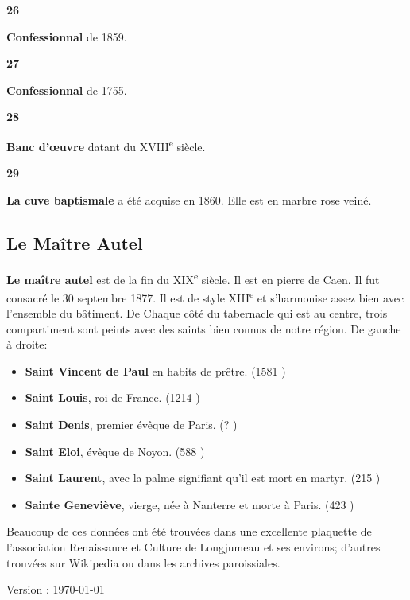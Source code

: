 \documentclass[a5paper, 9pt]{extarticle}
\newcommand{\linednote}[2]{
  \noindent
  \parbox[t]{0.9cm}{\small \textbf{#1}}%
  \parbox[t]{\dimexpr\linewidth-0.9cm}{\normalsize #2 \vspace{0.4em}}
  \newline
}
\begin{document}
\linednote{26}{\textbf{Confessionnal} de 1859.}
\linednote{27}{\textbf{Confessionnal} de 1755.}
\linednote{28}{\textbf{Banc d'œuvre} datant du \textsc{XVIII}\textsuperscript{e} siècle.}
\linednote{29}{\textbf{La cuve baptismale} a été acquise en 1860. Elle est en marbre rose veiné.}

\subsection*{Le Maître Autel}

\textbf{Le maître autel} est de la fin du \textsc{XIX}\textsuperscript{e}
siècle. Il est en pierre de Caen. Il fut consacré le 30 septembre
1877. Il est de style \textsc{XIII}\textsuperscript{e} et s'harmonise
assez bien avec l'ensemble du bâtiment. De Chaque côté du tabernacle
qui est au centre, trois compartiment sont peints avec des saints bien
connus de notre région. De gauche à droite:
\begin{itemize}[noitemsep,label=\textbullet]
  \item \textbf{Saint Vincent de Paul} en habits de prêtre. (1581 )
  \item \textbf{Saint Louis}, roi de France. (1214 )
  \item \textbf{Saint Denis}, premier évêque de Paris. (? )
  \item \textbf{Saint Eloi}, évêque de Noyon. (588 )
  \item \textbf{Saint Laurent}, avec la palme signifiant qu'il est mort en martyr. (215 )
  \item \textbf{Sainte Geneviève}, vierge, née à Nanterre et morte à Paris. (423 )
\end{itemize}

\vspace*{\fill}

Beaucoup de ces données ont été trouvées dans une excellente plaquette
de l'association Renaissance et Culture de Longjumeau et ses environs;
d'autres trouvées sur Wikipedia ou dans les archives paroissiales.

\vspace*{\fill}

\begin{flushbottom}
  \begin{center}
    \scriptsize Version : \today
  \end{center}
\end{flushbottom}
\end{document}
